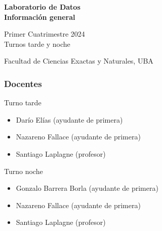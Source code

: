 \documentclass[aspectratio=169,12pt]{beamer}
\begin{document}

\begin{frame}

 \begin{center}

\Large\textbf{Laboratorio de Datos} \\
\large\textbf{Información general}




\vspace{1cm}
Primer Cuatrimestre 2024 \\ Turnos tarde y noche

\vspace{1cm}


 {\small Facultad de Ciencias Exactas y Naturales, UBA}
 \end{center}


\end{frame}


\begin{frame}
\frametitle{Docentes}

{\large Turno tarde}

\begin{itemize}
\item Darío Elías (ayudante de primera)
\item Nazareno Fallace (ayudante de primera)
\item Santiago Laplagne (profesor)
\end{itemize}

{\large Turno noche}

\begin{itemize}
\item Gonzalo Barrera Borla (ayudante de primera)
\item Nazareno Fallace (ayudante de primera)
\item Santiago Laplagne (profesor)
\end{itemize}

\end{frame}
\end{document}
